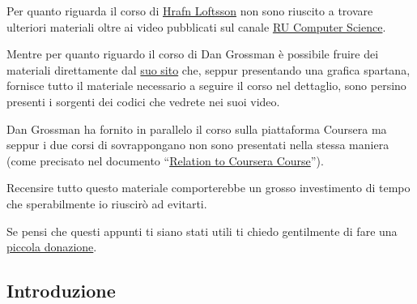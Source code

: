 \documentclass{article}
\begin{document}
Per quanto riguarda il corso di \href{https://en.ru.is/kennarar/hrafn/}{Hrafn Loftsson} non sono riuscito a trovare ulteriori materiali oltre ai video pubblicati sul canale \href{https://www.youtube.com/channel/UCVqVubGFAhdFKOh2QWvBH4Q}{RU Computer Science}.

Mentre per quanto riguardo il corso di Dan Grossman è possibile fruire dei materiali direttamente dal \href{https://courses.cs.washington.edu/courses/cse341/13wi/}{suo sito} che, seppur presentando una grafica spartana, fornisce tutto il materiale necessario a seguire il corso nel dettaglio, sono persino presenti i sorgenti dei codici che vedrete nei suoi video.

Dan Grossman ha fornito in parallelo il corso sulla piattaforma Coursera ma seppur i due corsi di sovrappongano non sono presentati nella stessa maniera (come precisato nel documento ``\href{https://courses.cs.washington.edu/courses/cse341/13wi/courseraRelation.pdf}{Relation to Coursera Course}'').

Recensire tutto questo materiale comporterebbe un grosso investimento di tempo che sperabilmente io riuscirò ad evitarti.

Se pensi che questi appunti ti siano stati utili ti chiedo gentilmente di fare una \href{https://paypal.me/pools/c/85MUW0ex8l}{piccola donazione}.

\subsection{Introduzione}
\end{document}

